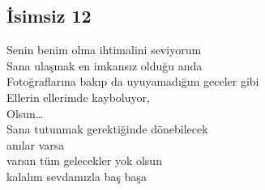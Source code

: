 \subsection{İsimsiz 12}

Senin benim olma ihtimalini seviyorum \\
Sana ulaşmak en imkansız olduğu anda \\
Fotoğraflarına bakıp da uyuyamadığım geceler gibi \\
Ellerin ellerimde kayboluyor, \\
Olsun… \\

\noindent\newline
Sana tutunmak gerektiğinde dönebilecek \\
anılar varsa \\
varsın tüm gelecekler yok olsun \\
kalalım sevdamızla baş başa \\